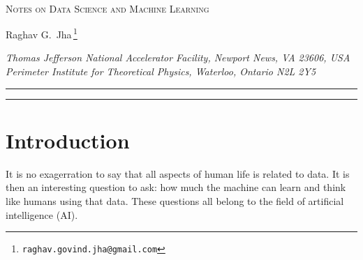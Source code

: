 \documentclass[11pt]{article}
\begin{document}
	\begin{titlepage}
		\setcounter{page}{1} \baselineskip=15.5pt \thispagestyle{empty}
		\bigskip\
		\vspace{1cm}
		\begin{center}
			{\fontsize{19}{38}\textsc{Notes on Data Science and Machine Learning}}  %
		\end{center}
		\vspace{0.2cm}
		\begin{center}
			{\fontsize{12}{30}\selectfont Raghav G.~Jha\orcidA{}\,\footnote{\texttt{raghav.govind.jha@gmail.com}}}
		\end{center}
		
		
		\begin{center}
			\vskip 7pt
			\textsl{Thomas Jefferson National Accelerator Facility, Newport News, VA 23606, USA\\
			Perimeter Institute for Theoretical Physics, Waterloo, Ontario N2L 2Y5\\
				}
			\vskip 6pt
		\end{center}
		
		\vspace{2.6cm}
		\hrule \vspace{0.2cm}
\vspace{0.5cm}
\hrule

\vspace{0.5cm}		
		\tableofcontents
		\vspace{0.6cm}
	\end{titlepage}
	
	
	\section{Introduction}
	
	It is no exagerration to say that all aspects of human life is related to data. 
	It is then an interesting question to ask: how much the machine can learn and think 
	like humans using that data. These questions all belong to the field of artificial intelligence (AI). 
	
\end{document}
